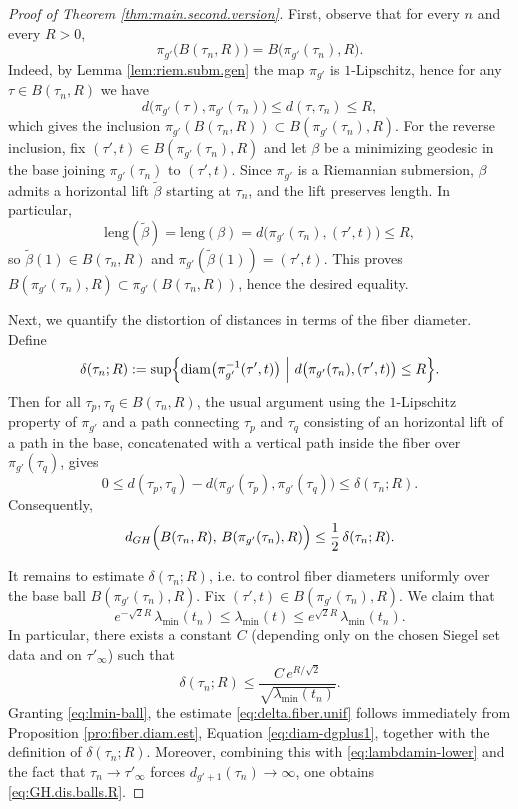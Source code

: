 \documentclass[11pt]{amsart}
\theoremstyle{plain}
\theoremstyle{definition}
\theoremstyle{remark}
\begin{document}
\begin{proof}[Proof of Theorem \ref{thm:main.second.version}]
    First, observe that for every $n$ and every $R>0$,
    \[
        \pi_{g'}\bigl(B(\tau_n,R)\bigr)=B\bigl(\pi_{g'}(\tau_n),R\bigr).
    \]
    Indeed, by Lemma \ref{lem:riem.subm.gen} the map $\pi_{g'}$ is $1$-Lipschitz, hence for any $\tau\in B(\tau_n,R)$ we have
    \[
        d\bigl(\pi_{g'}(\tau),\pi_{g'}(\tau_n)\bigr)\le d(\tau,\tau_n)\le R,
    \]
    which gives the inclusion $\pi_{g'}(B(\tau_n,R))\subset B(\pi_{g'}(\tau_n),R)$. For the reverse inclusion, fix $(\tau',t)\in B(\pi_{g'}(\tau_n),R)$ and let $\beta$ be a minimizing geodesic in the base joining $\pi_{g'}(\tau_n)$ to $(\tau',t)$. Since $\pi_{g'}$ is a Riemannian submersion, $\beta$ admits a horizontal lift $\tilde\beta$ starting at $\tau_n$, and the lift preserves length. In particular,
    \[
        \mathrm{leng}(\tilde\beta)=\mathrm{leng}(\beta) = d\bigl(\pi_{g'}(\tau_n),(\tau',t)\bigr)\le R,
    \]
    so $\tilde\beta(1)\in B(\tau_n,R)$ and $\pi_{g'}(\tilde\beta(1))=(\tau',t)$. This proves $B(\pi_{g'}(\tau_n),R)\subset \pi_{g'}(B(\tau_n,R))$, hence the desired equality.

    Next, we quantify the distortion of distances in terms of the fiber diameter. Define
    \[
        \delta(\tau_n;R):=\sup\Bigl\{\operatorname{diam}\bigl(\pi^{-1}_{g'}(\tau',t)\bigr)\ \Big|\ d\bigl(\pi_{g'}(\tau_n),(\tau',t)\bigr)\le R\Bigr\}.
    \]
    Then for all $\tau_p,\tau_q\in B(\tau_n,R)$, the usual argument using the $1$-Lipschitz property of $\pi_{g'}$ and a path connecting $\tau_p$ and $\tau_q$ consisting of an horizontal lift of a path in the base, concatenated with a vertical path inside the fiber over $\pi_{g'}(\tau_q)$, gives
    \[
        0\le d(\tau_p,\tau_q)-d\bigl(\pi_{g'}(\tau_p),\pi_{g'}(\tau_q)\bigr)\le \delta(\tau_n;R).
    \]
    Consequently,
    \[
        d_{GH}\Bigl(B(\tau_n,R),\, B(\pi_{g'}(\tau_n),R)\Bigr)\le \frac12\,\delta(\tau_n;R).
    \]

    It remains to estimate $\delta(\tau_n;R)$, i.e. to control fiber diameters uniformly over the base ball $B(\pi_{g'}(\tau_n),R)$. Fix $(\tau',t)\in B(\pi_{g'}(\tau_n),R)$. We claim that
    \begin{equation}
    \label{eq:lmin-ball}
    e^{-\sqrt{2}R}\,\lambda_{\min}(t_n)\leq \lambda_{\min}(t)\leq e^{\sqrt{2}R}\,\lambda_{\min}(t_n).
    \end{equation}
    In particular, there exists a constant $C$ (depending only on the chosen Siegel set data and on $\tau'_\infty$) such that
    \begin{equation}
        \label{eq:delta.fiber.unif}
        \delta(\tau_n;R)\leq \frac{C\,e^{R/\sqrt{2}}}{\sqrt{\lambda_{\min}(t_n)}}.
    \end{equation}
    Granting \eqref{eq:lmin-ball}, the estimate \eqref{eq:delta.fiber.unif} follows immediately from Proposition \ref{pro:fiber.diam.est}, Equation \eqref{eq:diam-dgplus1}, together with the definition of $\delta(\tau_n;R)$. Moreover, combining this with \eqref{eq:lambdamin-lower} and the fact that $\tau_n\to\tau'_\infty$ forces $d_{g'+1}(\tau_n)\to\infty$, one obtains \eqref{eq:GH.dis.balls.R}.


\end{proof}
\end{document}
